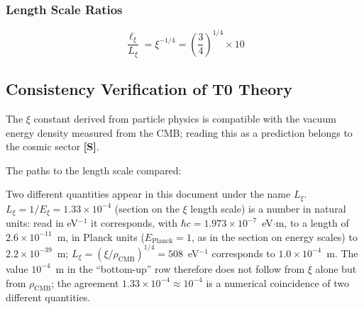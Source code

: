 	\subsubsection{Length Scale Ratios}
	
	\begin{equation}
		\frac{\ell_{\xi}}{L_\xi} = \xi^{-1/4} = \left(\frac{3}{4}\right)^{1/4} \times 10
	\end{equation}
	
	\subsection{Consistency Verification of T0 Theory}
	
	\begin{important}
		The $\xi$ constant derived from particle physics is compatible with the vacuum energy density measured from the CMB; reading this as a prediction belongs to the cosmic sector \textbf{[S]}.
	\end{important}
	
	The paths to the length scale compared:
	
	\begin{table}[htbp]
		\centering
		\caption{Consistency verification of the $\xi$ length scale}
	\end{table}
	Two different quantities appear in this document under the name $L_\xi$. $L_\xi = 1/E_\xi = 1.33 \times 10^{-4}$ (section on the $\xi$ length scale) is a number in natural units: read in eV$^{-1}$ it corresponds, with $\hbar c = 1.973 \times 10^{-7}$~eV$\cdot$m, to a length of $2.6 \times 10^{-11}$~m, in Planck units ($E_{\text{Planck}} = 1$, as in the section on energy scales) to $2.2 \times 10^{-39}$~m; $L_\xi = (\xi/\rho_{\text{CMB}})^{1/4} = 508$~eV$^{-1}$ corresponds to $1.0 \times 10^{-4}$~m. The value $10^{-4}$~m in the \enquote{bottom-up} row therefore does not follow from $\xi$ alone but from $\rho_{\text{CMB}}$; the agreement $1.33 \times 10^{-4} \approx 10^{-4}$ is a numerical coincidence of two different quantities.
	
